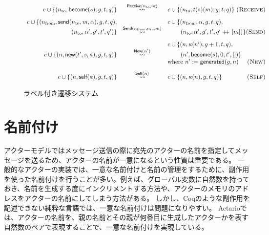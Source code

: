 \begin{figure}[t]\centering
  \begin{displaymath}
    \begin{array}{rcl}
      c \cup \{(n_{\textrm{to}}, \textsf{become}(s), g, t, q)\} &
      \overset{\textsf{Receive}(n_{\textrm{to}}, m)}{\leadsto} &
      c \cup \{(n_{\textrm{to}}, t(s)(m), g, t, q)\}
      \hfill \textsc{(Receive)} \\[2ex]

      c \cup \{(n_{\textrm{from}}, \textsf{send}(n_{\textrm{to}}, m, \alpha), g, t, q),
      & &
      c \cup \{(n_{\textrm{from}}, \alpha, g, t, q), \\
      (n_{\textrm{to}}, \alpha', g', t', q')\} &
      \overset{\textsf{Send}(n_{\textrm{from}}, n_{\textrm{to}}, m)}{\leadsto} &
      \hspace{5ex} (n_{\textrm{to}}, \alpha', g', t', q' \doubleplus [m])\}
      \hfill \textsc{(Send)} \\[2ex]

      & & c \cup \{(n, \kappa(n'), g + 1, t, q), \\
      c \cup \{(n, \textsf{new}(t', s, \kappa), g, t, q)\} &
      \overset{\textsf{New}(n')}{\leadsto} &
      \hspace{5ex} (n', \textsf{become}(s), 0, t', [])\} \\
      & & \textrm{where}\ n' := \textsf{generated}(g, n)
      \hfill \textsc{(New)} \\[2ex]

      c \cup \{(n, \textsf{self}(\kappa), g, t, q)\} &
      \overset{\textsf{Self}(n)}{\leadsto} &
      c \cup \{(n, \kappa(n), g, t, q)\}
      \hfill \textsc{(Self)}
    \end{array}
  \end{displaymath}
  \caption{ラベル付き遷移システム}\label{expr:formalization:semantics}
\end{figure}

\section{名前付け}

アクターモデルではメッセージ送信の際に宛先のアクターの名前を指定してメッセージを送るため、アクターの名前が一意になるという性質は重要である。
一般的なアクターの実装では、一意な名前付けと名前の管理をするために、副作用を使った名前付けを行うことが多い。例えば、グローバル変数に自然数を持っておき、名前を生成する度にインクリメントする方法や、アクターのメモリのアドレスをアクターの名前にしてしまう方法がある。
しかし、Coqのような副作用を記述できない純粋な言語では、一意な名前付けは問題になりやすい。
Actarioでは、アクターの名前を、親の名前とその親が何番目に生成したアクターかを表す自然数のペアで表現することで、一意な名前付けを実現している。

